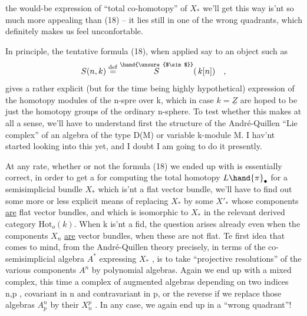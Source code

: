 
the would-be expression of ``total co-homotopy'' of $X_*$ we'll get this
way is'nt so much more appealing than (18) -- it lies still in one of
the wrong quadrants, which definitely makes us feel unconfortable.

In principle, the tentative formula (18), when applied say
to an object such as
\[ S(n,k)\overset{\mathrm{def}}{=} \overset{\hand{\unsure{$\sim$}}}{S}(\, k[n]) \quad , \]
gives a rather explicit (but for the time being highly hypothetical\hand{!})
expression of the homotopy modules of the n-spre over k, which in
case $k=\underline{Z}$ are hoped to be just the homotopy groups of the ordinary
n-sphere. To test whether this makes at all a sense, we'll have to
understand first the structure of the  André-Quillen ``Lie complex''
of an algebra  of the type D(M)\hand{,} or variable k-module M. I hav'nt started
looking into this yet, and I doubt I am going to do it presently.

At any rate, whether or not the formula (18) we ended up with
is essentially correct, in order  to get a   for computing
the total homotopy $L\hand{\pi}_{\bullet}$ for a semisimplicial bundle $X_*$ which is'nt a
flat vector bundle, we'll have to find out some more or less explicit
means of replacing $X_*$ by some $X'_*$  whose components \uline{are} flat vector
bundles, and which is isomorphic to $X_*$ in the relevant derived category
$\mathrm{Hot}_o(k)$. When k is'nt a fid, the question arises already even when 
 the components $X_n$ \uline{are} vector bundles, when these are not flat. Te
first idea that comes to mind, from the André-Quillen theory precisely,
 in terms of the co-semisimplicial algebra $A^*$ expressing $X_*$ ,
is to take ``projective resolutions'' of  the various components
$A^n$ by polynomial algebras. Again we end up with a mixed complex, this
time a complex of augmented algebras depending on two indices n,p ,
covariant in n and contravariant in p, or  the reverse if we
replace those algebras $A^n_p$ by their  $X_n^p$ . In any case,
we again end up in a ``wrong quadrant''! \margin{$\|$}

